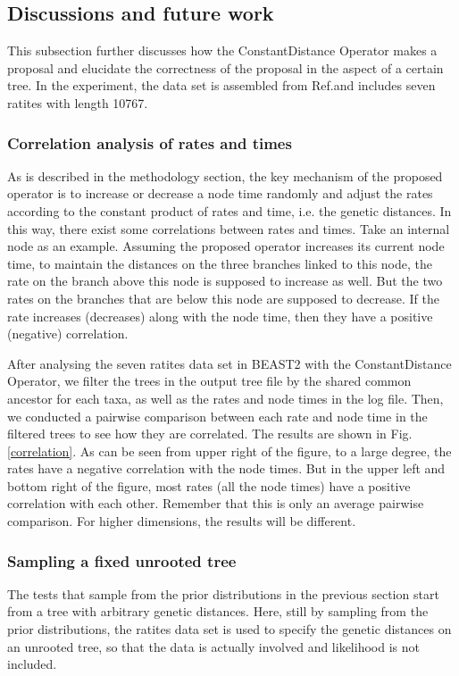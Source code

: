 \documentclass{bmcart}
\begin{document}
\subsection*{Discussions and future work}
This subsection further discusses how the ConstantDistance Operator makes a proposal and elucidate the correctness of the proposal in the aspect of a certain tree. In the experiment, the data set is assembled from Ref.\cite{cooper2001complete}and includes seven ratites with length 10767. 
\subsubsection*{Correlation analysis of rates and times}
As is described in the methodology section, the key mechanism of the proposed operator is to increase or decrease a node time randomly and adjust the rates according to the constant product of rates and time, i.e. the genetic distances. In this way, there exist some correlations between rates and times. Take an internal node as an example. Assuming the proposed operator increases its current node time, to maintain the distances on the three branches linked to this node, the rate on the branch above this node is supposed to increase as well. But the two rates on the branches that are below this node are supposed to decrease. If the rate increases (decreases) along with the node time, then they have a positive (negative) correlation. 

After analysing the seven ratites data set in BEAST2 with the ConstantDistance Operator, we filter the trees in the output tree file by the shared common ancestor for each taxa, as well as the rates and node times in the log file. Then, we conducted a pairwise comparison between each rate and node time in the filtered trees to see how they are correlated. The results are shown in Fig.\ref{correlation}. As can be seen from upper right of the figure, to a large degree, the rates have a negative correlation with the node times. But in the upper left and bottom right of the figure, most rates (all the node times) have a positive correlation with each other. Remember that this is only an average pairwise comparison. For higher dimensions, the results will be different. 
\subsubsection*{Sampling a fixed unrooted tree}
The tests that sample from the prior distributions in the previous section start from a tree with arbitrary genetic distances. Here, still by sampling from the prior distributions, the ratites data set is used to specify the genetic distances on an unrooted tree, so that the data is actually involved and likelihood is not included. 
\end{document}
